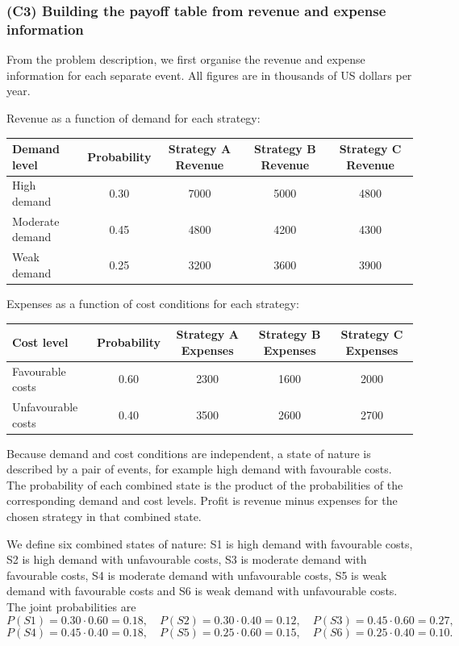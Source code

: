 \documentclass[11pt]{article}
\begin{document}
	\subsubsection{(C3) Building the payoff table from revenue and expense information}\label{subsubsec:example2-c3}
	
	From the problem description, we first organise the revenue and expense information for each separate event. All figures are in thousands of US dollars per year.
	
	\medskip
	\noindent Revenue as a function of demand for each strategy:
	\begin{table}[h!]
		\centering
		\begin{tabular}{@{}lcccc@{}}
			\toprule
			Demand level & Probability & Strategy A Revenue & Strategy B Revenue & Strategy C Revenue \\
			\midrule
			High demand     & 0.30 & 7000 & 5000 & 4800 \\
			Moderate demand & 0.45 & 4800 & 4200 & 4300 \\
			Weak demand     & 0.25 & 3200 & 3600 & 3900 \\
			\bottomrule
		\end{tabular}
	\end{table}
	
	\medskip
	\noindent Expenses as a function of cost conditions for each strategy:
	\begin{table}[h!]
		\centering
		\begin{tabular}{@{}lcccc@{}}
			\toprule
			Cost level & Probability & Strategy A Expenses & Strategy B Expenses & Strategy C Expenses \\
			\midrule
			Favourable costs   & 0.60 & 2300 & 1600 & 2000 \\
			Unfavourable costs & 0.40 & 3500 & 2600 & 2700 \\
			\bottomrule
		\end{tabular}
	\end{table}
	
	Because demand and cost conditions are independent, a state of nature is described by a pair of events, for example high demand with favourable costs. The probability of each combined state is the product of the probabilities of the corresponding demand and cost levels. Profit is revenue minus expenses for the chosen strategy in that combined state.
	
	\medskip
	We define six combined states of nature: S1 is high demand with favourable costs, S2 is high demand with unfavourable costs, S3 is moderate demand with favourable costs, S4 is moderate demand with unfavourable costs, S5 is weak demand with favourable costs and S6 is weak demand with unfavourable costs. The joint probabilities are
	\[
	P(S1)=0.30\cdot 0.60=0.18,\quad
	P(S2)=0.30\cdot 0.40=0.12,\quad
	P(S3)=0.45\cdot 0.60=0.27,
	\]
	\[
	P(S4)=0.45\cdot 0.40=0.18,\quad
	P(S5)=0.25\cdot 0.60=0.15,\quad
	P(S6)=0.25\cdot 0.40=0.10.
	\]
	
\end{document}
